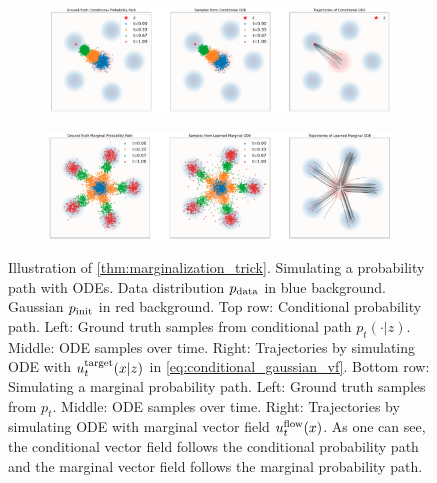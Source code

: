 \begin{figure}[t!]
\centering
   \begin{subfigure}[b]{\textwidth}
   \centering
   \includegraphics[width=\textwidth]{figures/conditional_ode.png}
   \label{fig:Ng1} 
\end{subfigure}
\begin{subfigure}[b]{\textwidth}
    \centering
   \includegraphics[width=\textwidth]{figures/marginal_ode.png}
   \label{fig:Ng2}
\end{subfigure}
\caption{\label{fig:cond_marginal_path_simulation}Illustration of \cref{thm:marginalization_trick}. Simulating a  probability path with ODEs. Data distribution $p_{\rm{data}}$ in blue background. Gaussian $p_{\rm{init}}$ in red background. Top row: Conditional probability path. Left: Ground truth samples from conditional path $p_t(\cdot|z)$. Middle: ODE samples over time. Right: Trajectories by simulating ODE with $u^{\text{target}}_t(x|z)$ in \cref{eq:conditional_gaussian_vf}. Bottom row: Simulating a marginal probability path. Left: Ground truth samples from $p_t$. Middle: ODE samples over time. Right: Trajectories by simulating ODE with marginal vector field $u^{\text{flow}}_t(x)$. As one can see, the conditional vector field follows the conditional probability path and the marginal vector field follows the marginal probability path.}
\end{figure}
